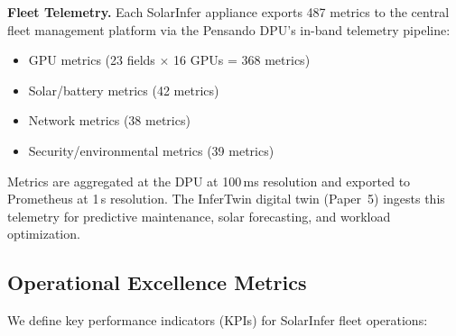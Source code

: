 \documentclass[conference,10pt,letterpaper]{IEEEtran}
\begin{document}
\textbf{Fleet Telemetry.} Each SolarInfer appliance exports 487 metrics to the central fleet management platform via the Pensando DPU's in-band telemetry pipeline:
\begin{itemize}
\item GPU metrics (23 fields $\times$ 16 GPUs = 368 metrics)
\item Solar/battery metrics (42 metrics)
\item Network metrics (38 metrics)
\item Security/environmental metrics (39 metrics)
\end{itemize}

Metrics are aggregated at the DPU at 100\,ms resolution and exported to Prometheus at 1\,s resolution. The InferTwin digital twin (Paper~5) ingests this telemetry for predictive maintenance, solar forecasting, and workload optimization.



\subsection{Operational Excellence Metrics}

We define key performance indicators (KPIs) for SolarInfer fleet operations:

\begin{table}[!t]
\caption{Operational KPIs}
\label{tab:kpis}
\centering\scriptsize
{}
\end{table}
\end{document}

